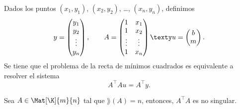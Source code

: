 \documentclass[a4,11pt]{aleph-notas}
\begin{document}
\begin{teo}
    Dados los puntos $(x_1,y_1)$, $(x_2,y_2)$, \ldots, $(x_n,y_n)$, definimos
    \[
        y = \begin{pmatrix}
            y_1 \\ y_2 \\ \vdots \\ y_n
        \end{pmatrix},
        \qquad
        A = \begin{pmatrix}
            1 & x_1 \\ 1 & x_2 \\ \vdots & \vdots \\ 1 & x_n
        \end{pmatrix}
        \texty
        u = \begin{pmatrix}
            b \\ m
        \end{pmatrix}.
    \]
    Se tiene que el problema de la recta de mínimos cuadrados es equivalente a resolver el sistema
    \[
        A^\intercal A u = A^\intercal y.
    \]
\end{teo}

\begin{teo}
    Sea $A\in\Mat[\K]{m}{n}$ tal que $\rang(A)=n$, entonces, $A^\intercal A$ es no singular.
\end{teo}
\end{document}
